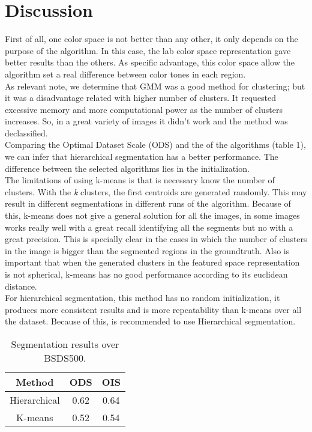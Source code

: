 \documentclass[10pt,twocolumn,letterpaper]{article}
\begin{document}
\section{Discussion}
First of all, one color space is not better than any other, it only depends on the purpose of the algorithm. In this case, the lab color space representation gave better results than the others. As specific advantage, this color space allow the algorithm set a real difference between color tones in each region.\\
\indent As relevant note, we determine that GMM was a good method for clustering; but it was a disadvantage related with higher number of clusters. It requested excessive memory and more computational power as the number of clusters increases. So, in a great variety of images it didn't work and the method was declassified.\\
\indent Comparing the Optimal Dataset Scale (ODS) and the of the algorithms (table 1), we can infer that hierarchical segmentation has a better performance. The difference between the selected algorithms lies in the initialization.\\
\indent The limitations of using k-means is that is necessary know the number of clusters. With the \textit{k} clusters, the first centroids are generated randomly. This may result in different segmentations in different runs of the algorithm. Because of this, k-means does not give a general solution for all the images, in some images works really well with a great recall identifying all the segments but no with a great precision. This is specially clear in the cases in which the number of clusters in the image is bigger than the segmented regions in the groundtruth. Also is important that when the generated clusters in the featured space representation is not spherical, k-means has no good performance according to its euclidean distance.\\
\indent For hierarchical segmentation, this method has no random initialization, it produces more consistent results and is more repeatability than k-means over all the dataset. Because of this, is recommended to use Hierarchical segmentation.
\begin{table}
\centering
\begin{tabular}{|c|c|c|}
\hline
\textbf{Method} & \textbf{ODS} & \textbf{OIS}\\
\hline
Hierarchical & 0.62 & 0.64\\
\hline
K-means & 0.52 & 0.54\\
\hline
\end{tabular}
\caption{\label{tab:table-name} Segmentation results over BSDS500.}
\end{table}
\end{document}
